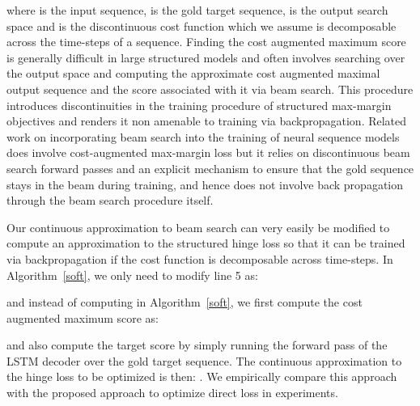 \documentclass[letterpaper]{article} \usepackage{aaai18}  \usepackage{times}  \usepackage{helvet}  \usepackage{courier}  \usepackage{url}  \usepackage{graphicx}  \frenchspacing
\begin{document}
where  is the input sequence,  is the gold target sequence,  is the output search space and  is the discontinuous cost function which we assume is decomposable across the time-steps of a sequence. Finding the cost augmented maximum score is generally difficult in large structured models and often involves searching over the output space and computing the approximate cost augmented maximal output sequence and the score associated with it via beam search. This procedure introduces discontinuities in the training procedure of structured max-margin objectives and renders it non amenable to training via backpropagation. Related work \cite{wiseman2016sequence} on incorporating beam search into the training of neural sequence models does involve cost-augmented max-margin loss but it relies on discontinuous beam search forward passes and an explicit mechanism to ensure that the gold sequence stays in the beam during training, and hence does not involve back propagation through the beam search procedure itself.

Our continuous approximation to beam search can very easily be modified to compute an approximation to the structured hinge loss so that it can be trained via backpropagation if the cost function is decomposable across time-steps. In Algorithm~\ref{soft}, we only need to modify line 5 as:

and instead of computing  in Algorithm~\ref{soft}, we first compute the cost augmented maximum score as:

and also compute the target score  by simply running the forward pass of the LSTM decoder over the gold target sequence. The continuous approximation to the hinge loss to be optimized is then: . We empirically compare this approach with the proposed approach to optimize direct loss in experiments.
\end{document}

